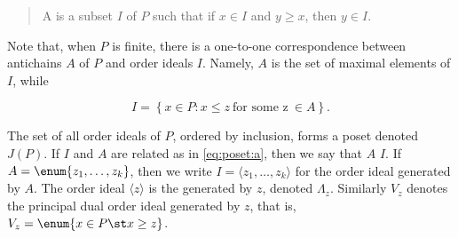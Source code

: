 \begin{quotation}
A  is a subset $I$ of $P$ such that if $x \in I$
and $y \ge x$, then $y \in I$.
\end{quotation}

Note that, when $P$ is finite, there is a one-to-one correspondence between
antichains $A$ of $P$ and order ideals $I$. Namely, $A$ is the set of maximal
elements of $I$, while

\begin{equation}
\label{eq:poset:a}
I = \left\{{x \in P : x \le z ~\text{for some z}~ \in A}\right\}.
\end{equation}

The set of all order ideals of $P$, ordered by inclusion, forms a poset denoted
$J(P)$. If $I$ and $A$ are related as in \ref{eq:poset:a}, then we say that $A$
 $I$. If $A = \enum{z_1 , \ldots , z_k}$, then we
write $I = \langle z_1 , \ldots , z_k \rangle$ for the order ideal generated by
$A$. The order ideal $\langle z \rangle$ is the 
generated by $z$, denoted $\Lambda_z$. Similarly $V_z$ denotes the principal
dual order ideal generated by $z$, that is, $V_z = \enum{x \in P \st x \ge
z}$.

